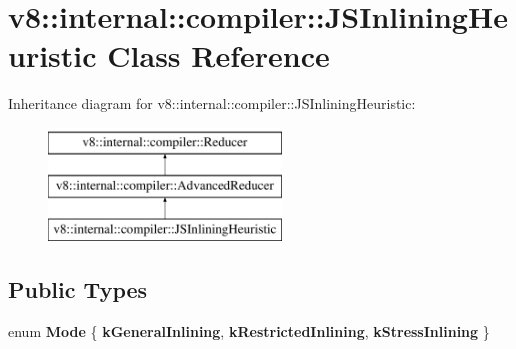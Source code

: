 \hypertarget{classv8_1_1internal_1_1compiler_1_1JSInliningHeuristic}{}\section{v8\+:\+:internal\+:\+:compiler\+:\+:J\+S\+Inlining\+Heuristic Class Reference}
\label{classv8_1_1internal_1_1compiler_1_1JSInliningHeuristic}
Inheritance diagram for v8\+:\+:internal\+:\+:compiler\+:\+:J\+S\+Inlining\+Heuristic\+:\begin{figure}[H]
\begin{center}
\leavevmode
\includegraphics[height=3.000000cm]{classv8_1_1internal_1_1compiler_1_1JSInliningHeuristic}
\end{center}
\end{figure}
\subsection*{Public Types}
\begin{DoxyCompactItemize}
\item 
\mbox{\label{classv8_1_1internal_1_1compiler_1_1JSInliningHeuristic_a460dfd6f51f754658f4d9d8b155fc66e}} 
enum {\bfseries Mode} \{ {\bfseries k\+General\+Inlining}, 
{\bfseries k\+Restricted\+Inlining}, 
{\bfseries k\+Stress\+Inlining}
 \}
\end{DoxyCompactItemize}
